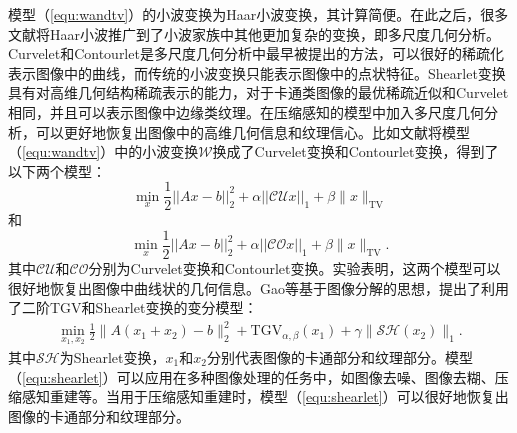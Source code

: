 模型（\ref{equ:wandtv}）的小波变换为Haar小波变换\cite{stankovic2003haar}，其计算简便。在此之后，很多文献将Haar小波推广到了小波家族中其他更加复杂的变换，即多尺度几何分析。Curvelet\cite{candes2000curvelets}和Contourlet\cite{do2005contourlet}是多尺度几何分析中最早被提出的方法，可以很好的稀疏化表示图像中的曲线，而传统的小波变换只能表示图像中的点状特征。Shearlet\cite{easley2008sparse}变换具有对高维几何结构稀疏表示的能力，对于卡通类图像的最优稀疏近似和Curvelet相同，并且可以表示图像中边缘类纹理。在压缩感知的模型中加入多尺度几何分析，可以更好地恢复出图像中的高维几何信息和纹理信心。比如文献\cite{qu2010combined,qu2010iterative}将模型（\ref{equ:wandtv}）中的小波变换$\mathcal{W}$换成了Curvelet变换和Contourlet变换，得到了以下两个模型：
\begin{equation}
	\min_x\frac{1}{2}||Ax-b||^2_2+\alpha ||\mathcal{CU}x||_1+\beta \|x\|_\mathrm{TV}
\end{equation}
和
\begin{equation}
	\min_x\frac{1}{2}||Ax-b||^2_2+\alpha ||\mathcal{CO}x||_1+\beta \|x\|_\mathrm{TV}.
\end{equation}
其中$\mathcal{CU}$和$\mathcal{CO}$分别为Curvelet变换和Contourlet变换。实验表明，这两个模型可以很好地恢复出图像中曲线状的几何信息。Gao等\cite{infimaltgv}基于图像分解的思想，提出了利用了二阶TGV和Shearlet变换的变分模型：
\begin{equation}
	\begin{aligned}
		\min_{x_1,x_2}\frac{1}{2}\|A(x_1+x_2)-b\|^2_2+\mathrm{TGV}_{\alpha,\beta}(x_1)+\gamma\|\mathcal{SH}(x_2)\|_1.
	\end{aligned}
	\label{equ:shearlet}
\end{equation}
其中$\mathcal{SH}$为Shearlet变换，$x_1$和$x_2$分别代表图像的卡通部分和纹理部分。模型（\ref{equ:shearlet}）可以应用在多种图像处理的任务中，如图像去噪、图像去糊、压缩感知重建等。当用于压缩感知重建时，模型（\ref{equ:shearlet}）可以很好地恢复出图像的卡通部分和纹理部分。

